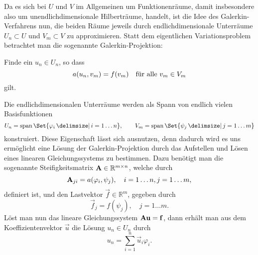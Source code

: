 Da es sich bei $U$ und $V$ im Allgemeinen um Funktionenräume, damit insbesondere also um unendlichdimensionale Hilberträume, handelt, ist die Idee des Galerkin-Verfahrens nun, die beiden Räume jeweils durch endlichdimensionale Unterräume $U_{n} \subset U$ und $V_{m} \subset V$ zu approximieren.
Statt dem eigentlichen Variationsproblem betrachtet man die sogenannte Galerkin-Projektion:
\begin{Problem}
    Finde ein $u_{n} \in U_{n}$, so dass
    \begin{equation}
        a(u_{n}, v_{m}) = f(v_{m}) \quad \fa v_{m} \in V_{m}
    \end{equation}
    gilt.
\end{Problem}

Die endlichdimensionalen Unterräume werden als Spann von endlich vielen Basisfunktionen
\begin{equation}
    U_{n} = \spn\Set{\varphi_{i} \given i = 1 \dots n},
    \qquad
    V_{m} = \spn\Set{ \psi_{j} \given j = 1 \dots m}
\end{equation}
konstruiert.
Diese Eigenschaft lässt sich ausnutzen, denn dadurch wird es uns ermöglicht eine Lösung der Galerkin-Projektion durch das Aufstellen und Lösen eines linearen Gleichungssystems zu bestimmen.
Dazu benötigt man die sogenannte Steifigkeitsmatrix $\mat A \in \mathbb{R}^{m \times n}$, welche durch
\begin{equation}
    \mat A_{ji} = a(\varphi_{i}, \psi_{j}), \quad i = 1 \dots n, j = 1 \dots m,
\end{equation}
definiert ist, und den Lastvektor $\vec f \in \mathbb{R}^{m}$, gegeben durch
\begin{equation}
    \vec f_{j} = f(\psi_{j}), \quad j = 1 \dots m.
\end{equation}
Löst man nun das lineare Gleichungssystem $\mat A \vec u = \vec f$, dann erhält man aus dem Koeffizientenvektor $\vec u$ die Lösung $u_{n} \in U_{n}$ durch
\begin{equation}
    u_{n} = \sum_{i = 1}^{n} \vec u_{i} \varphi_{i}.
\end{equation}




